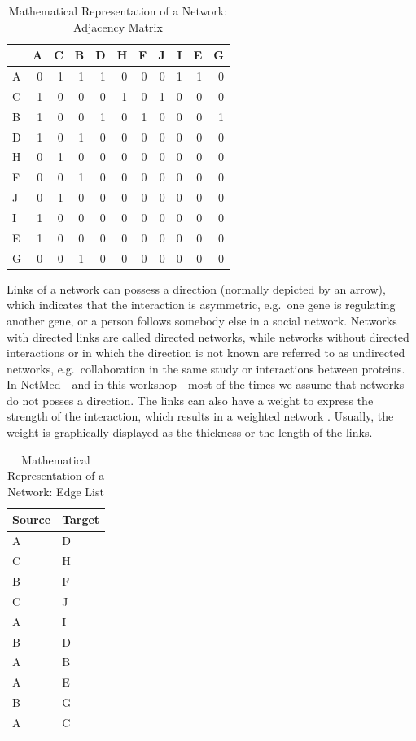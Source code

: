\documentclass[
]{book}
\begin{document}
\begin{table}

\caption{\label{tab:ADJ}Mathematical Representation of a Network: Adjacency Matrix}
\centering
\begin{tabular}[t]{l|r|r|r|r|r|r|r|r|r|r}
\hline
  & A & C & B & D & H & F & J & I & E & G\\
\hline
A & 0 & 1 & 1 & 1 & 0 & 0 & 0 & 1 & 1 & 0\\
\hline
C & 1 & 0 & 0 & 0 & 1 & 0 & 1 & 0 & 0 & 0\\
\hline
B & 1 & 0 & 0 & 1 & 0 & 1 & 0 & 0 & 0 & 1\\
\hline
D & 1 & 0 & 1 & 0 & 0 & 0 & 0 & 0 & 0 & 0\\
\hline
H & 0 & 1 & 0 & 0 & 0 & 0 & 0 & 0 & 0 & 0\\
\hline
F & 0 & 0 & 1 & 0 & 0 & 0 & 0 & 0 & 0 & 0\\
\hline
J & 0 & 1 & 0 & 0 & 0 & 0 & 0 & 0 & 0 & 0\\
\hline
I & 1 & 0 & 0 & 0 & 0 & 0 & 0 & 0 & 0 & 0\\
\hline
E & 1 & 0 & 0 & 0 & 0 & 0 & 0 & 0 & 0 & 0\\
\hline
G & 0 & 0 & 1 & 0 & 0 & 0 & 0 & 0 & 0 & 0\\
\hline
\end{tabular}
\end{table}

Links of a network can possess a direction (normally depicted by an arrow), which indicates that the interaction is asymmetric, e.g.~one gene is regulating another gene, or a person follows somebody else in a social network. Networks with directed links are called directed networks, while networks without directed interactions or in which the direction is not known are referred to as undirected networks, e.g.~collaboration in the same study or interactions between proteins. In NetMed - and in this workshop - most of the times we assume that networks do not posses a direction. The links can also have a weight to express the strength of the interaction, which results in a weighted network \citep{Newman2018, Barabasi2016}. Usually, the weight is graphically displayed as the thickness or the length of the links.

\begin{table}

\caption{\label{tab:EL}Mathematical Representation of a Network: Edge List}
\centering
\begin{tabular}[t]{l|l}
\hline
Source & Target\\
\hline
A & D\\
\hline
C & H\\
\hline
B & F\\
\hline
C & J\\
\hline
A & I\\
\hline
B & D\\
\hline
A & B\\
\hline
A & E\\
\hline
B & G\\
\hline
A & C\\
\hline
\end{tabular}
\end{table}
\end{document}
